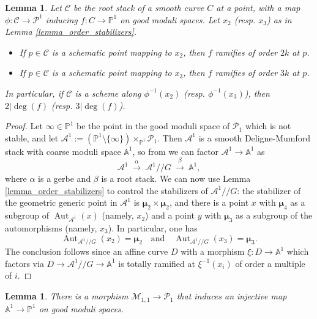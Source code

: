 \documentclass[a4paper,12pt]{amsart}
\DeclareMathOperator{\Aut}{Aut}
\newcommand{\bA}{{\mathbb A}}
\newcommand{\bP}{{\mathbb P}}
\newcommand{\sP}{{\mathscr{P}}}
\newcommand{\cA}{{\mathcal{A}}}
\newcommand{\bmu}{\bm{\mu}}
\newcommand\cC{{\mathcal{C}}}
\newcommand\cM{{\mathcal{M}}}
\newtheorem{lemma}[theorem]{Lemma}
\theoremstyle{definition}
\theoremstyle{remark}
\begin{document}
\begin{lemma}\label{lemma_if_C_is_a_scheme_on_the_pteimage_of_x_i_then_i_divides_the_order_of_f}
    Let $\cC$ be the root stack of a smooth curve $C$ at a point, with a map $\phi\colon\cC\to \sP^1$ inducing $f\colon C\to \bP^1$ on good moduli spaces. Let $x_2$ (resp. $x_3$) as in Lemma \ref{lemma_order_stabilizers}. 
    \begin{itemize}
        \item If $p\in \cC$ is a schematic point mapping to $x_2$, then $f$ ramifies of order $2k$ at $p$.
        \item If $p\in \cC$ is a schematic point mapping to $x_3$, then $f$ ramifies of order $3k$ at $p$.
    \end{itemize}
    In particular, if $\cC$ is a scheme along $\phi^{-1}(x_2)$ (resp. $\phi^{-1}(x_3)$), then $2|\deg(f)$ (resp. $3|\deg(f)$).
\end{lemma}
\begin{proof}
Let $\infty\in \bP^1$ be the point in the good moduli space of $\sP_1$ which is not stable, and let $\cA^1:=(\bP^1\setminus \{\infty\})\times_{\bP^1}\sP_1$. Then $\cA^1$ is a smooth Deligne-Mumford stack with coarse moduli space $\bA^1$, so from \cite[Theorem 1 and Remark 2]{geraschenko2017bottom} we can factor $\cA^1\to \bA^1$ as $$\cA^1\ \xrightarrow{\alpha} \ \cA^1/\!\!/G\ \xrightarrow{\beta} \ \bA^1,$$ where $\alpha$ is a gerbe and $\beta$ is a root stack. We can now use Lemma \ref{lemma_order_stabilizers} to control the stabilizers of $\cA^1/\!\!/G$: the stabilizer of the geometric generic point in $\cA^1$ is $\bmu_2\times \bmu_2$, and there is a point $x$ with $\bmu_4$ as a subgroup of $\Aut_{\cA^1}(x)$ (namely, $x_2$) and a point $y$ with $\bmu_3$ as a subgroup of the automorphisms (namely, $x_3$). In particular, one has \[
\Aut_{\cA^1/\!\!/G}(x_2)=\bmu_2\ \ \ \text{ and } \ \ \ \Aut_{\cA^1/\!\!/G}(x_3)=\bmu_3.
\]
The conclusion follows since an affine curve $D$ with a morphism $\xi:D\to \bA^1$ which factors via $D\to \cA^1/\!\!/G\to \bA^1$ is totally ramified at $\xi^{-1}(x_i)$ of order a multiple of $i$. 
\end{proof}
\begin{lemma}\label{lemma_M11_to_P1_is_injective}
    There is a morphism $\cM_{1,1}\to \sP_1$ that induces an injective map $\bA^1\to \bP^1$ on good moduli spaces.
\end{lemma}
\end{document}
